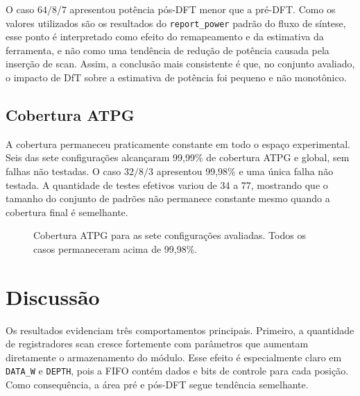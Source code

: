 \documentclass[conference]{IEEEtran}
\begin{document}
O caso $64/8/7$ apresentou potência pós-DFT menor que a pré-DFT. Como os valores utilizados são os resultados do \texttt{report\_power} padrão do fluxo de síntese, esse ponto é interpretado como efeito do remapeamento e da estimativa da ferramenta, e não como uma tendência de redução de potência causada pela inserção de scan. Assim, a conclusão mais consistente é que, no conjunto avaliado, o impacto de DfT sobre a estimativa de potência foi pequeno e não monotônico.

\subsection{Cobertura ATPG}

A cobertura permaneceu praticamente constante em todo o espaço experimental. Seis das sete configurações alcançaram 99,99\% de cobertura ATPG e global, sem falhas não testadas. O caso $32/8/3$ apresentou 99,98\% e uma única falha não testada. A quantidade de testes efetivos variou de 34 a 77, mostrando que o tamanho do conjunto de padrões não permanece constante mesmo quando a cobertura final é semelhante.

\begin{figure}[!t]
\centering
{}
\caption{Cobertura ATPG para as sete configurações avaliadas. Todos os casos permaneceram acima de 99,98\%.}
\label{fig:coverage}
\end{figure}

\section{Discussão}
Os resultados evidenciam três comportamentos principais. Primeiro, a quantidade de registradores scan cresce fortemente com parâmetros que aumentam diretamente o armazenamento do módulo. Esse efeito é especialmente claro em \texttt{DATA\_W} e \texttt{DEPTH}, pois a FIFO contém dados e bits de controle para cada posição. Como consequência, a área pré e pós-DFT segue tendência semelhante.
\end{document}
